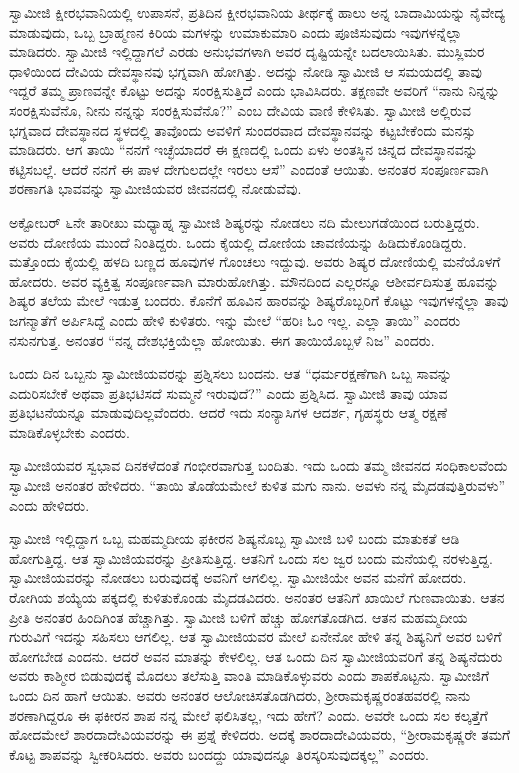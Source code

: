  ಸ್ವಾಮೀಜಿ ಕ್ಷೀರಭವಾನಿಯಲ್ಲಿ ಉಪಾಸನೆ, ಪ್ರತಿದಿನ ಕ್ಷೀರಭವಾನಿಯ ತೀರ್ಥಕ್ಕೆ ಹಾಲು ಅನ್ನ ಬಾದಾಮಿಯನ್ನು ನೈವೇದ್ಯ ಮಾಡುವುದು, ಒಬ್ಬ ಬ್ರಾಹ್ಮಣನ ಕಿರಿಯ ಮಗಳನ್ನು ಉಮಾಕುಮಾರಿ ಎಂದು ಪೂಜಿಸುವುದು ಇವುಗಳನ್ನೆಲ್ಲಾ ಮಾಡಿದರು. ಸ್ವಾಮೀಜಿ ಇಲ್ಲಿದ್ದಾಗಲೆ ಎರಡು ಅನುಭವಗಳಾಗಿ ಅವರ ದೃಷ್ಟಿಯನ್ನೇ ಬದಲಾಯಿಸಿತು. ಮುಸ್ಲಿಮರ ಧಾಳಿಯಿಂದ ದೇವಿಯ ದೇವಸ್ಥಾನವು ಭಗ್ನವಾಗಿ ಹೋಗಿತ್ತು. ಅದನ್ನು ನೋಡಿ ಸ್ವಾಮೀಜಿ ಆ ಸಮಯದಲ್ಲಿ ತಾವು ಇದ್ದರೆ ತಮ್ಮ ಪ್ರಾಣವನ್ನೇ ಕೊಟ್ಟು ಅದನ್ನು ಸಂರಕ್ಷಿಸುತ್ತಿದೆ ಎಂದು ಭಾವಿಸಿದರು. ತಕ್ಷಣವೇ ಅವರಿಗೆ “ನಾನು ನಿನ್ನನ್ನು ಸಂರಕ್ಷಿಸುವೆನೊ, ನೀನು ನನ್ನನ್ನು ಸಂರಕ್ಷಿಸುವೆನೊ?” ಎಂಬ ದೇವಿಯ ವಾಣಿ ಕೇಳಿಸಿತು. ಸ್ವಾಮೀಜಿ ಅಲ್ಲಿರುವ ಭಗ್ನವಾದ ದೇವಸ್ಥಾನದ ಸ್ಥಳದಲ್ಲಿ ತಾವೊಂದು ಅವಳಿಗೆ ಸುಂದರವಾದ ದೇವಸ್ಥಾನವನ್ನು ಕಟ್ಟಬೇಕೆಂದು ಮನಸ್ಸು ಮಾಡಿದರು. ಆಗ ತಾಯಿ “ನನಗೆ ಇಚ್ಛೆಯಾದರೆ ಈ ಕ್ಷಣದಲ್ಲಿ ಒಂದು ಏಳು ಅಂತಸ್ಥಿನ ಚಿನ್ನದ ದೇವಸ್ಥಾನವನ್ನು ಕಟ್ಟಿಸಬಲ್ಲೆ. ಆದರೆ ನನಗೆ ಈ ಪಾಳ ದೇಗುಲದಲ್ಲೇ ಇರಲು ಆಸೆ” ಎಂದಂತೆ ಆಯಿತು. ಅನಂತರ ಸಂಪೂರ್ಣವಾಗಿ ಶರಣಾಗತಿ ಭಾವವನ್ನು ಸ್ವಾಮೀಜಿಯವರ ಜೀವನದಲ್ಲಿ ನೋಡುವೆವು. 

 ಅಕ್ಟೋಬರ್ ೬ನೇ ತಾರೀಖು ಮಧ್ಯಾಹ್ನ ಸ್ವಾಮೀಜಿ ಶಿಷ್ಯರನ್ನು ನೋಡಲು ನದಿ ಮೇಲುಗಡೆಯಿಂದ ಬರುತ್ತಿದ್ದರು. ಅವರು ದೋಣಿಯ ಮುಂದೆ ನಿಂತಿದ್ದರು. ಒಂದು ಕೈಯಲ್ಲಿ ದೋಣಿಯ ಚಾವಣಿಯನ್ನು ಹಿಡಿದುಕೊಂಡಿದ್ದರು. ಮತ್ತೊಂದು ಕೈಯಲ್ಲಿ ಹಳದಿ ಬಣ್ಣದ ಹೂವುಗಳ ಗೊಂಚಲು ಇದ್ದುವು. ಅವರು ಶಿಷ್ಯರ ದೋಣಿಯಲ್ಲಿ ಮನೆಯೊಳಗೆ ಹೋದರು. ಅವರ ವ್ಯಕ್ತಿತ್ವ ಸಂಪೂರ್ಣವಾಗಿ ಮಾರುಹೋಗಿತ್ತು. ಮೌನದಿಂದ ಎಲ್ಲರನ್ನೂ ಆಶೀರ್ವದಿಸುತ್ತ ಹೂವನ್ನು ಶಿಷ್ಯರ ತಲೆಯ ಮೇಲೆ ಇಡುತ್ತ ಬಂದರು. ಕೊನೆಗೆ ಹೂವಿನ ಹಾರವನ್ನು ಶಿಷ್ಯರೊಬ್ಬರಿಗೆ ಕೊಟ್ಟು ಇವುಗಳನ್ನೆಲ್ಲಾ ತಾವು ಜಗನ್ಮಾತೆಗೆ ಅರ್ಪಿಸಿದ್ದೆ ಎಂದು ಹೇಳಿ ಕುಳಿತರು. ಇನ್ನು ಮೇಲೆ “ಹರಿಃ ಓಂ ಇಲ್ಲ. ಎಲ್ಲಾ ತಾಯಿ” ಎಂದರು ನಸುನಗುತ್ತ. ಅನಂತರ “ನನ್ನ ದೇಶಭಕ್ತಿಯೆಲ್ಲಾ ಹೋಯಿತು. ಈಗ ತಾಯಿಯೊಬ್ಬಳೆ ನಿಜ” ಎಂದರು. 

 ಒಂದು ದಿನ ಒಬ್ಬನು ಸ್ವಾಮೀಜಿಯವರನ್ನು ಪ್ರಶ್ನಿಸಲು ಬಂದನು. ಆತ “ಧರ್ಮರಕ್ಷಣೆಗಾಗಿ ಒಬ್ಬ ಸಾವನ್ನು ಎದುರಿಸಬೇಕೆ ಅಥವಾ ಪ್ರತಿಭಟಿಸದೆ ಸುಮ್ಮನೆ ಇರುವುದೆ?” ಎಂದು ಪ್ರಶ್ನಿಸಿದ. ಸ್ವಾಮೀಜಿ ತಾವು ಯಾವ ಪ್ರತಿಭಟನೆಯನ್ನೂ ಮಾಡುವುದಿಲ್ಲವೆಂದರು. ಆದರೆ ಇದು ಸಂನ್ಯಾಸಿಗಳ ಆದರ್ಶ, ಗೃಹಸ್ಥರು ಆತ್ಮ ರಕ್ಷಣೆ ಮಾಡಿಕೊಳ್ಳಬೇಕು ಎಂದರು. 

 ಸ್ವಾಮೀಜಿಯವರ ಸ್ವಭಾವ ದಿನಕಳೆದಂತೆ ಗಂಭೀರವಾಗುತ್ತ ಬಂದಿತು. ಇದು ಒಂದು ತಮ್ಮ ಜೀವನದ ಸಂಧಿಕಾಲವೆಂದು ಸ್ವಾಮೀಜಿ ಅನಂತರ ಹೇಳಿದರು. “ತಾಯಿ ತೊಡೆಯಮೇಲೆ ಕುಳಿತ ಮಗು ನಾನು. ಅವಳು ನನ್ನ ಮೈದಡವುತ್ತಿರುವಳು” ಎಂದು ಹೇಳಿದರು. 

 ಸ್ವಾಮೀಜಿ ಇಲ್ಲಿದ್ದಾಗ ಒಬ್ಬ ಮಹಮ್ಮದೀಯ ಫಕೀರನ ಶಿಷ್ಯನೊಬ್ಬ ಸ್ವಾಮೀಜಿ ಬಳಿ ಬಂದು ಮಾತುಕತೆ ಆಡಿ ಹೋಗುತ್ತಿದ್ದ. ಆತ ಸ್ವಾಮಿಜಿಯವರನ್ನು ಪ್ರೀತಿಸುತ್ತಿದ್ದ. ಆತನಿಗೆ ಒಂದು ಸಲ ಜ್ವರ ಬಂದು ಮನೆಯಲ್ಲಿ ನರಳುತ್ತಿದ್ದ. ಸ್ವಾಮೀಜಿಯವರನ್ನು ನೋಡಲು ಬರುವುದಕ್ಕೆ ಅವನಿಗೆ ಆಗಲಿಲ್ಲ. ಸ್ವಾಮೀಜಿಯೇ ಅವನ ಮನೆಗೆ ಹೋದರು. ರೋಗಿಯ ಶಯ್ಯೆಯ ಪಕ್ಕದಲ್ಲಿ ಕುಳಿತುಕೊಂಡು ಮೈದಡವಿದರು. ಅನಂತರ ಆತನಿಗೆ ಖಾಯಿಲೆ ಗುಣವಾಯಿತು. ಆತನ ಪ್ರೀತಿ ಅನಂತರ ಹಿಂದಿಗಿಂತ ಹೆಚ್ಚಾಗಿತ್ತು. ಸ್ವಾಮೀಜಿ ಬಳಿಗೆ ಹೆಚ್ಚು ಹೋಗತೊಡಗಿದ. ಆತನ ಮಹಮ್ಮದೀಯ ಗುರುವಿಗೆ ಇದನ್ನು ಸಹಿಸಲು ಆಗಲಿಲ್ಲ. ಆತ ಸ್ವಾಮೀಜಿಯವರ ಮೇಲೆ ಏನೇನೋ ಹೇಳಿ ತನ್ನ ಶಿಷ್ಯನಿಗೆ ಅವರ ಬಳಿಗೆ ಹೋಗಬೇಡ ಎಂದನು. ಆದರೆ ಅವನ ಮಾತನ್ನು ಕೇಳಲಿಲ್ಲ. ಆತ ಒಂದು ದಿನ ಸ್ವಾಮೀಜಿಯವರಿಗೆ ತನ್ನ ಶಿಷ್ಯನೆದುರು ಅವರು ಕಾಶ್ಮೀರ ಬಿಡುವುದಕ್ಕೆ ಮೊದಲು ತಲೆಸುತ್ತಿ ವಾಂತಿ ಮಾಡಿಕೊಳ್ಳುವರು ಎಂದು ಶಾಪಕೊಟ್ಟನು. ಸ್ವಾಮೀಜಿಗೆ ಒಂದು ದಿನ ಹಾಗೆ ಆಯಿತು. ಅವರು ಅನಂತರ ಆಲೋಚಿಸತೊಡಗಿದರು, ಶ‍್ರೀರಾಮಕೃಷ್ಣರಂತಹವರಲ್ಲಿ ನಾನು ಶರಣಾಗಿದ್ದರೂ ಈ ಫಕೀರನ ಶಾಪ ನನ್ನ ಮೇಲೆ ಫಲಿಸಿತಲ್ಲ, ಇದು ಹೇಗೆ? ಎಂದು. ಅವರೇ ಒಂದು ಸಲ ಕಲ್ಕತ್ತೆಗೆ ಹೋದಮೇಲೆ ಶಾರದಾದೇವಿಯವರನ್ನು ಈ ಪ್ರಶ್ನೆ ಕೇಳಿದರು. ಅದಕ್ಕೆ ಶಾರದಾದೇವಿಯವರು, “ಶ‍್ರೀರಾಮಕೃಷ್ಣರೇ ತಮಗೆ ಕೊಟ್ಟ ಶಾಪವನ್ನು ಸ್ವೀಕರಿಸಿದರು. ಅವರು ಬಂದದ್ದು ಯಾವುದನ್ನೂ ತಿರಸ್ಕರಿಸುವುದಕ್ಕಲ್ಲ” ಎಂದರು. 

